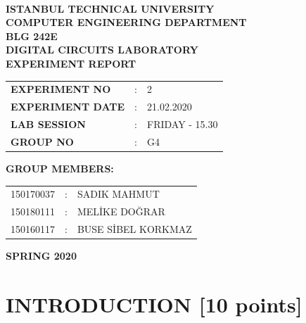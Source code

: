 \documentclass[pdftex,12pt,a4paper]{article}
\begin{document}
\begin{titlepage}
\begin{center}
\textbf{}\\
\textbf{\Large{ISTANBUL TECHNICAL UNIVERSITY}}\\
\vspace{0.5cm}
\textbf{\Large{COMPUTER ENGINEERING DEPARTMENT}}\\
\vspace{2cm}
\textbf{\Large{BLG 242E\\ DIGITAL CIRCUITS LABORATORY\\ EXPERIMENT REPORT}}\\
\vspace{2.8cm}
\begin{table}[ht]
\centering
\Large{
\begin{tabular}{lcl}
\textbf{EXPERIMENT NO}  & : & 2 \\
\textbf{EXPERIMENT DATE}  & : & 21.02.2020 \\
\textbf{LAB SESSION}  & : & FRIDAY - 15.30 \\
\textbf{GROUP NO}  & : & G4 \\
\end{tabular}}
\end{table}
\vspace{1cm}
\textbf{\Large{GROUP MEMBERS:}}\\
\begin{table}[ht]
\centering
\Large{
\begin{tabular}{rcl}
150170037  & : & SADIK MAHMUT \\
150180111  & : & MELİKE DOĞRAR   \\
150160117  & : & BUSE SİBEL KORKMAZ \\
\end{tabular}}
\end{table}
\vspace{2.8cm}
\textbf{\Large{SPRING 2020}}

\end{center}

\end{titlepage}

\thispagestyle{empty}
\setcounter{tocdepth}{4}
\tableofcontents
\clearpage

\setcounter{page}{1}

\section{INTRODUCTION [10 points]}
\end{document}
